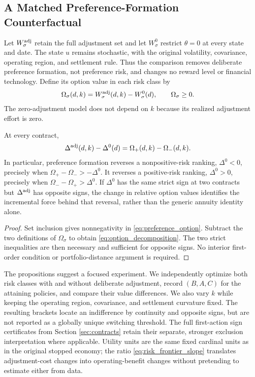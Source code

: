\subsection{A Matched Preference-Formation Counterfactual}
Let $W_\sigma^{\rm adj}$ retain the full adjustment set and let $W_\sigma^0$ restrict $\theta=0$ at every state and date. The state $u$ remains stochastic, with the original volatility, covariance, operating region, and settlement rule. Thus the comparison removes deliberate preference formation, not preference risk, and changes no reward level or financial technology. Define its option value in each risk class by
\begin{equation}
 \Omega_\sigma(d,k)=W_\sigma^{\rm adj}(d,k)-W_\sigma^0(d),\qquad
 \Omega_\sigma\geq0.
 \label{eq:preference_option}
\end{equation}
The zero-adjustment model does not depend on $k$ because its realized adjustment effort is zero.

\begin{proposition}
\label{prop:option_decomposition}
At every contract,
\begin{equation}
 \Delta^{\rm adj}(d,k)-\Delta^0(d)=\Omega_+(d,k)-\Omega_-(d,k).
 \label{eq:option_decomposition}
\end{equation}
In particular, preference formation reverses a nonpositive-risk ranking, $\Delta^0<0$, precisely when
$\Omega_+-\Omega_->-\Delta^0$. It reverses a positive-risk ranking, $\Delta^0>0$, precisely when
$\Omega_--\Omega_+>\Delta^0$. If $\Delta^0$ has the same strict sign at two contracts but $\Delta^{\rm adj}$ has opposite signs, the change in relative option values identifies the incremental force behind that reversal, rather than the generic annuity identity alone.
\end{proposition}
\begin{proof}
Set inclusion gives nonnegativity in \eqref{eq:preference_option}. Subtract the two definitions of $\Omega_\sigma$ to obtain \eqref{eq:option_decomposition}. The two strict inequalities are then necessary and sufficient for opposite signs. No interior first-order condition or portfolio-distance argument is required.
\end{proof}

The propositions suggest a focused experiment. We independently optimize both risk classes with and without deliberate adjustment, record $(B,A,C)$ for the attaining policies, and compare their value differences. We also vary $k$ while keeping the operating region, covariance, and settlement curvature fixed. The resulting brackets locate an indifference by continuity and opposite signs, but are not reported as a globally unique switching threshold. The full first-action sign certificates from Section \ref{sec:contracts} retain their separate, stronger exclusion interpretation where applicable. Utility units are the same fixed cardinal units as in the original stopped economy; the ratio \eqref{eq:risk_frontier_slope} translates adjustment-cost changes into operating-benefit changes without pretending to estimate either from data.
